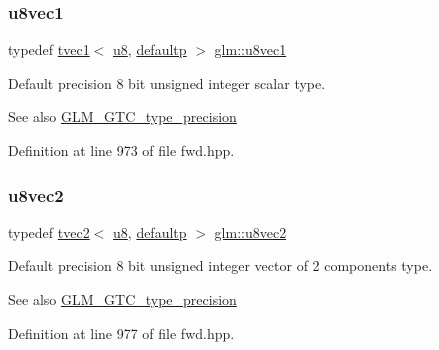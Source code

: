\subsubsection{\texorpdfstring{u8vec1}{u8vec1}}
{\footnotesize\ttfamily typedef \mbox{\hyperlink{structglm_1_1tvec1}{tvec1}}$<$ \mbox{\hyperlink{group__gtc__type__precision_ga5e3dc67373d5068997d2d9f41c9024d2}{u8}}, \mbox{\hyperlink{namespaceglm_a0f04f086094c747d227af4425893f545a9d21ccd8b5a009ec7eb7677befc3bf51}{defaultp}} $>$ \mbox{\hyperlink{group__gtc__type__precision_ga024be724ff45865952190522b03fc0d5}{glm\+::u8vec1}}}

Default precision 8 bit unsigned integer scalar type. \begin{DoxySeeAlso}{See also}
\mbox{\hyperlink{group__gtc__type__precision}{G\+L\+M\+\_\+\+G\+T\+C\+\_\+type\+\_\+precision}} 
\end{DoxySeeAlso}


Definition at line 973 of file fwd.\+hpp.

\mbox{\label{group__gtc__type__precision_ga1c259b876f8757eb197b83a5fab476f0}} 
\subsubsection{\texorpdfstring{u8vec2}{u8vec2}}
{\footnotesize\ttfamily typedef \mbox{\hyperlink{structglm_1_1tvec2}{tvec2}}$<$ \mbox{\hyperlink{group__gtc__type__precision_ga5e3dc67373d5068997d2d9f41c9024d2}{u8}}, \mbox{\hyperlink{namespaceglm_a0f04f086094c747d227af4425893f545a9d21ccd8b5a009ec7eb7677befc3bf51}{defaultp}} $>$ \mbox{\hyperlink{group__gtc__type__precision_ga1c259b876f8757eb197b83a5fab476f0}{glm\+::u8vec2}}}

Default precision 8 bit unsigned integer vector of 2 components type. \begin{DoxySeeAlso}{See also}
\mbox{\hyperlink{group__gtc__type__precision}{G\+L\+M\+\_\+\+G\+T\+C\+\_\+type\+\_\+precision}} 
\end{DoxySeeAlso}


Definition at line 977 of file fwd.\+hpp.

\mbox{\label{group__gtc__type__precision_ga8262aeb120701de1b57773eb10be0f35}} 
